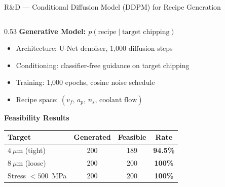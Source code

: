\documentclass[aspectratio=169,11pt]{beamer}
\begin{document}
\begin{frame}[shrink=10]{R\&D --- Conditional Diffusion Model (DDPM) for Recipe Generation}
  \begin{columns}[T]
    \begin{column}{0.53\textwidth}
      \textbf{Generative Model: $p(\text{recipe} \mid \text{target chipping})$
        \cite{ho2020ddpm}}
      \begin{itemize}
        \item Architecture: U-Net denoiser, 1{,}000 diffusion steps
        \item Conditioning: classifier-free guidance on target chipping
        \item Training: 1{,}000 epochs, cosine noise schedule
        \item Recipe space: $(v_f,\, a_p,\, n_s,\, \text{coolant flow})$
      \end{itemize}

      \vspace{0.5em}
      \textbf{Feasibility Results}

      \vspace{0.3em}
      \begin{tabular}{lccc}
        \toprule
        Target & Generated & Feasible & Rate \\
        \midrule
        $4~\mu$m (tight) & 200 & 189 & \textbf{94.5\%} \\
        $8~\mu$m (loose) & 200 & 200 & \textbf{100\%}  \\
        Stress $< 500$~MPa & 200 & 200 & \textbf{100\%} \\
        \bottomrule
      \end{tabular}


\end{column}
\end{columns}
\end{frame}
\end{document}
